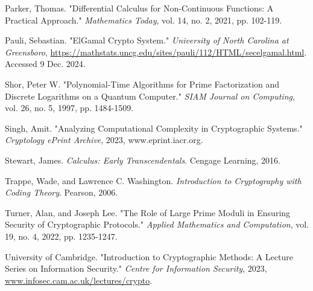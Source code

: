 \documentclass[12pt]{article}
\begin{document}
\begin{thebibliography}{9}
Parker, Thomas. "Differential Calculus for Non-Continuous Functions: A Practical Approach." \textit{Mathematics Today}, vol. 14, no. 2, 2021, pp. 102-119.

Pauli, Sebastian. "ElGamal Crypto System." \textit{University of North Carolina at Greensboro}, \url{https://mathstats.uncg.edu/sites/pauli/112/HTML/secelgamal.html}. Accessed 9 Dec. 2024.

Shor, Peter W. "Polynomial-Time Algorithms for Prime Factorization and Discrete Logarithms on a Quantum Computer." \textit{SIAM Journal on Computing}, vol. 26, no. 5, 1997, pp. 1484-1509.

Singh, Amit. "Analyzing Computational Complexity in Cryptographic Systems." \textit{Cryptology ePrint Archive}, 2023, www.eprint.iacr.org.

Stewart, James. \textit{Calculus: Early Transcendentals}. Cengage Learning, 2016.

Trappe, Wade, and Lawrence C. Washington. \textit{Introduction to Cryptography with Coding Theory}. Pearson, 2006.

Turner, Alan, and Joseph Lee. "The Role of Large Prime Moduli in Ensuring Security of Cryptographic Protocols." \textit{Applied Mathematics and Computation}, vol. 19, no. 4, 2022, pp. 1235-1247.

University of Cambridge. "Introduction to Cryptographic Methods: A Lecture Series on Information Security." \textit{Centre for Information Security}, 2023, \url{www.infosec.cam.ac.uk/lectures/crypto}.

\end{thebibliography}
\end{document}
